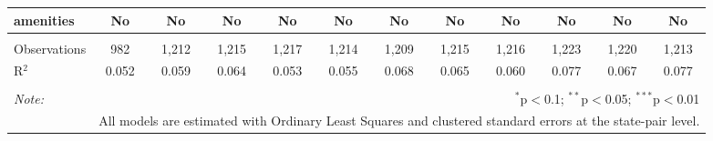 \begin{table}[!htbp]
\begin{tabular}{@{\extracolsep{5pt}}lccccccccccc}
amenities & No & No & No & No & No & No & No & No & No & No & No \\ 
\hline \\[-1.8ex] 
Observations & 982 & 1,212 & 1,215 & 1,217 & 1,214 & 1,209 & 1,215 & 1,216 & 1,223 & 1,220 & 1,213 \\ 
R$^{2}$ & 0.052 & 0.059 & 0.064 & 0.053 & 0.055 & 0.068 & 0.065 & 0.060 & 0.077 & 0.067 & 0.077 \\ 
\hline 
\hline \\[-1.8ex] 
\textit{Note:}  & \multicolumn{11}{r}{$^{*}$p$<$0.1; $^{**}$p$<$0.05; $^{***}$p$<$0.01} \\ 
 & \multicolumn{11}{r}{All models are estimated with Ordinary Least Squares and clustered standard errors at the state-pair level.} \\ 
\end{tabular} 
\end{table} 
